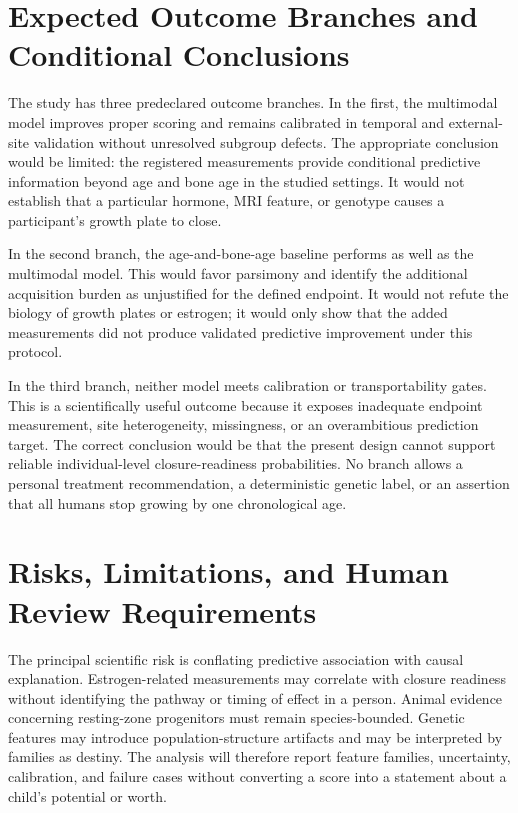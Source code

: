 \documentclass[conference]{IEEEtran}
\begin{document}
\section{Expected Outcome Branches and Conditional Conclusions}

The study has three predeclared outcome branches. In the first, the multimodal model improves proper scoring and remains calibrated in temporal and external-site validation without unresolved subgroup defects. The appropriate conclusion would be limited: the registered measurements provide conditional predictive information beyond age and bone age in the studied settings. It would not establish that a particular hormone, MRI feature, or genotype causes a participant's growth plate to close.

In the second branch, the age-and-bone-age baseline performs as well as the multimodal model. This would favor parsimony and identify the additional acquisition burden as unjustified for the defined endpoint. It would not refute the biology of growth plates or estrogen; it would only show that the added measurements did not produce validated predictive improvement under this protocol.

In the third branch, neither model meets calibration or transportability gates. This is a scientifically useful outcome because it exposes inadequate endpoint measurement, site heterogeneity, missingness, or an overambitious prediction target. The correct conclusion would be that the present design cannot support reliable individual-level closure-readiness probabilities. No branch allows a personal treatment recommendation, a deterministic genetic label, or an assertion that all humans stop growing by one chronological age.

\section{Risks, Limitations, and Human Review Requirements}

The principal scientific risk is conflating predictive association with causal explanation. Estrogen-related measurements may correlate with closure readiness without identifying the pathway or timing of effect in a person. Animal evidence concerning resting-zone progenitors must remain species-bounded. Genetic features may introduce population-structure artifacts and may be interpreted by families as destiny. The analysis will therefore report feature families, uncertainty, calibration, and failure cases without converting a score into a statement about a child's potential or worth.
\end{document}
